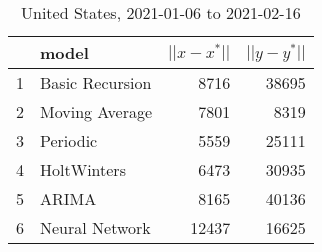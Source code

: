 \begin{table}[H]
\centering
\begin{tabular}{rlrr}
  \hline
 & model & $||x-x^*||$ & $||y-y^*||$ \\ 
  \hline
1 & Basic Recursion & 8716 & 38695 \\ 
  2 & Moving Average & 7801 & 8319 \\ 
  3 & Periodic & 5559 & 25111 \\ 
  4 & HoltWinters & 6473 & 30935 \\ 
  5 & ARIMA & 8165 & 40136 \\ 
  6 & Neural Network & 12437 & 16625 \\ 
   \hline
\end{tabular}
\caption{United States, 2021-01-06 to 2021-02-16} 
\label{fig:United Statessummarydf}
\end{table}

